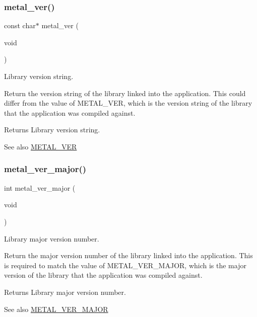 \subsubsection{\texorpdfstring{metal\+\_\+ver()}{metal\_ver()}}
{\footnotesize\ttfamily const char$\ast$ metal\+\_\+ver (\begin{DoxyParamCaption}\item[{void}]{ }\end{DoxyParamCaption})}



Library version string. 

Return the version string of the library linked into the application. This could differ from the value of M\+E\+T\+A\+L\+\_\+\+V\+ER, which is the version string of the library that the application was compiled against.

\begin{DoxyReturn}{Returns}
Library version string. 
\end{DoxyReturn}
\begin{DoxySeeAlso}{See also}
\hyperlink{config_8h_a18b62ae89064d33b905076a400f8076d}{M\+E\+T\+A\+L\+\_\+\+V\+ER} 
\end{DoxySeeAlso}
\mbox{\label{group__versions_ga269febc3c3d38804d790339b3c9266c4}} 
\subsubsection{\texorpdfstring{metal\+\_\+ver\+\_\+major()}{metal\_ver\_major()}}
{\footnotesize\ttfamily int metal\+\_\+ver\+\_\+major (\begin{DoxyParamCaption}\item[{void}]{ }\end{DoxyParamCaption})}



Library major version number. 

Return the major version number of the library linked into the application. This is required to match the value of M\+E\+T\+A\+L\+\_\+\+V\+E\+R\+\_\+\+M\+A\+J\+OR, which is the major version of the library that the application was compiled against.

\begin{DoxyReturn}{Returns}
Library major version number. 
\end{DoxyReturn}
\begin{DoxySeeAlso}{See also}
\hyperlink{config_8h_a55f8a5b0c1369f2828e0ac64216eb0df}{M\+E\+T\+A\+L\+\_\+\+V\+E\+R\+\_\+\+M\+A\+J\+OR} 
\end{DoxySeeAlso}
\mbox{\label{group__versions_ga373901f20ed1c78d65be47a1ca0d45e9}} 
